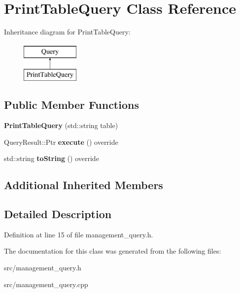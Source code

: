 \hypertarget{class_print_table_query}{}\section{Print\+Table\+Query Class Reference}
\label{class_print_table_query}
Inheritance diagram for Print\+Table\+Query\+:\begin{figure}[H]
\begin{center}
\leavevmode
\includegraphics[height=2.000000cm]{class_print_table_query}
\end{center}
\end{figure}
\subsection*{Public Member Functions}
\begin{DoxyCompactItemize}
\item 
\mbox{\label{class_print_table_query_a321e11750a9e0e077b3f9411b14dd4a7}} 
{\bfseries Print\+Table\+Query} (std\+::string table)
\item 
\mbox{\label{class_print_table_query_a0e7005c9ed6b3b870b4f435e74bfa0c7}} 
Query\+Result\+::\+Ptr {\bfseries execute} () override
\item 
\mbox{\label{class_print_table_query_a143832fd9bbdcb923674a8a2bc9bf83e}} 
std\+::string {\bfseries to\+String} () override
\end{DoxyCompactItemize}
\subsection*{Additional Inherited Members}


\subsection{Detailed Description}


Definition at line 15 of file management\+\_\+query.\+h.



The documentation for this class was generated from the following files\+:\begin{DoxyCompactItemize}
\item 
src/management\+\_\+query.\+h\item 
src/management\+\_\+query.\+cpp\end{DoxyCompactItemize}
